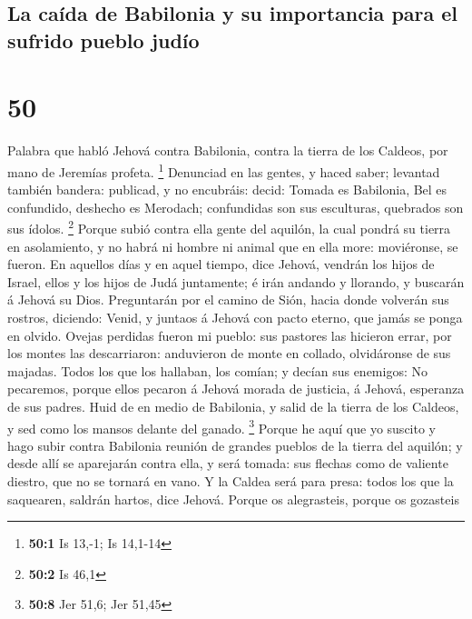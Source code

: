 \hypertarget{la-cauxedda-de-babilonia-y-su-importancia-para-el-sufrido-pueblo-juduxedo}{%
\subsection{La caída de Babilonia y su importancia para el sufrido
pueblo
judío}\label{la-cauxedda-de-babilonia-y-su-importancia-para-el-sufrido-pueblo-juduxedo}}

\hypertarget{section-49}{%
\section{50}\label{section-49}}

 Palabra que habló Jehová contra Babilonia, contra la
tierra de los Caldeos, por mano de Jeremías profeta. \footnote{\textbf{50:1}
  Is 13,-1; Is 14,1-14}  Denunciad en las gentes, y haced
saber; levantad también bandera: publicad, y no encubráis: decid: Tomada
es Babilonia, Bel es confundido, deshecho es Merodach; confundidas son
sus esculturas, quebrados son sus ídolos. \footnote{\textbf{50:2} Is
  46,1}  Porque subió contra ella gente del aquilón, la
cual pondrá su tierra en asolamiento, y no habrá ni hombre ni animal que
en ella more: moviéronse, se fueron.  En aquellos días y
en aquel tiempo, dice Jehová, vendrán los hijos de Israel, ellos y los
hijos de Judá juntamente; é irán andando y llorando, y buscarán á Jehová
su Dios.  Preguntarán por el camino de Sión, hacia donde
volverán sus rostros, diciendo: Venid, y juntaos á Jehová con pacto
eterno, que jamás se ponga en olvido.  Ovejas perdidas
fueron mi pueblo: sus pastores las hicieron errar, por los montes las
descarriaron: anduvieron de monte en collado, olvidáronse de sus
majadas.  Todos los que los hallaban, los comían; y decían
sus enemigos: No pecaremos, porque ellos pecaron á Jehová morada de
justicia, á Jehová, esperanza de sus padres.  Huid de en
medio de Babilonia, y salid de la tierra de los Caldeos, y sed como los
mansos delante del ganado. \footnote{\textbf{50:8} Jer 51,6; Jer 51,45}
 Porque he aquí que yo suscito y hago subir contra
Babilonia reunión de grandes pueblos de la tierra del aquilón; y desde
allí se aparejarán contra ella, y será tomada: sus flechas como de
valiente diestro, que no se tornará en vano.  Y la Caldea
será para presa: todos los que la saquearen, saldrán hartos, dice
Jehová.  Porque os alegrasteis, porque os gozasteis
